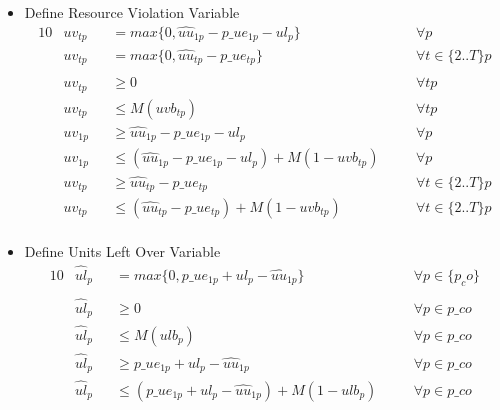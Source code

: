 \begin{itemize}
	
	\item Define Resource Violation Variable
	\begin{alignat}{10}
		& uv_{tp} 
			&& = max\{0 , \hat{uu}_{1p} - p\_{ue}_{1p} - ul_{p}\} \quad 
			&& \forall p \\ 
		& uv_{tp} 
			&& = max\{0 , \hat{uu}_{tp} - p\_{ue}_{tp}\} \quad
			&& \forall t \in \{2..T\} p \\ \\
		& uv_{tp} 
			&&\ge 0 \quad
			&& \forall tp \\
		& uv_{tp} 
			&& \le  M(uvb_{tp}) \quad
			&& \forall tp \\
		& uv_{1p} 
			&&\ge \hat{uu}_{1p} - p\_ue_{1p} - ul_{p} \quad
			&& \forall p \\
		& uv_{1p} 
		&& \le  (\hat{uu}_{1p} - p\_ue_{1p} - ul_{p}) + M(1-uvb_{tp}) \quad
		&& \forall p \\
		& uv_{tp} 
			&&\ge \hat{uu}_{tp} - p\_ue_{tp} \quad
			&& \forall t \in \{2..T \} p \\
		& uv_{tp} 
		&& \le  (\hat{uu}_{tp} - p\_ue_{tp}) + M(1-uvb_{tp}) \quad
		&& \forall t \in \{ 2..T \} p \\
	\end{alignat}
	
	\item Define Units Left Over Variable
	\begin{alignat}{10}
		& \hat{ul}_{p} 
			&& = max \{0, p\_ue_{1p} + ul_{p} - \hat{uu}_{1p} \}
			&& \forall p \in \{p_co\} \\ \\
		& \hat{ul}_{p} 
			&& \ge 0 \quad 
			&& \forall p  \in p\_co \\
		& \hat{ul}_{p} 
			&& \le M (ulb_{p}) \quad 
			&& \forall p  \in p\_co\\
		& \hat{ul}_{p} 
			&& \ge p\_ue_{1p} + ul_{p} - \hat{uu}_{1p} \quad 
			&& \forall p  \in p\_co\\
		& \hat{ul}_{p} 
			&& \le (p\_ue_{1p} + ul_{p} - \hat{uu}_{1p}) + M(1-ulb_{p}) \quad 
			&& \forall p  \in p\_co
	\end{alignat}
\end{itemize}

